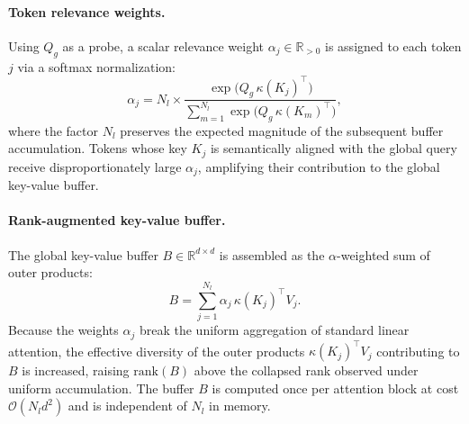\paragraph{Token relevance weights.} Using $Q_g$ as a probe, a scalar relevance weight $\alpha_j \in \mathbb{R}_{>0}$ is assigned to each token $j$ via a softmax normalization:
\begin{equation}
\alpha_j = N_l \times
    \frac{\exp\!\bigl(Q_g\,\kappa(K_j)^\top\bigr)}
    {\displaystyle\sum_{m=1}^{N_l} \exp\!\bigl(Q_g\,\kappa(K_m)^\top\bigr)},
\label{eq:alpha_weights}
\end{equation}
where the factor $N_l$ preserves the expected magnitude of the subsequent buffer accumulation. Tokens whose key $K_j$ is semantically aligned with the global query receive disproportionately large $\alpha_j$, amplifying their contribution to the global key-value buffer.

\paragraph{Rank-augmented key-value buffer.} The global key-value buffer $B \in \mathbb{R}^{d \times d}$ is assembled as the $\alpha$-weighted sum of outer products:
\begin{equation}
B = \sum_{j=1}^{N_l} \alpha_j\, \kappa(K_j)^\top V_j.
\label{eq:rala_buffer}
\end{equation}
Because the weights $\alpha_j$ break the uniform aggregation of standard linear attention, the effective diversity of the outer products $\kappa(K_j)^\top V_j$ contributing to $B$ is increased, raising $\mathrm{rank}(B)$ above the collapsed rank observed under uniform accumulation. The buffer $B$ is computed once per attention block at cost $\mathcal{O}(N_l d^2)$ and is independent of $N_l$ in memory.

